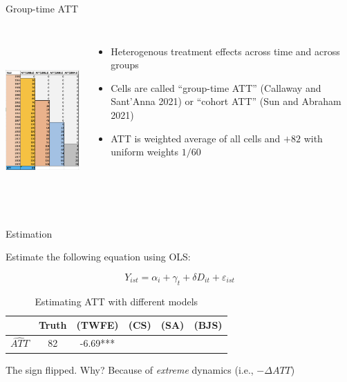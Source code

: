\documentclass{beamer}
\begin{document}
\begin{frame}{Group-time ATT}
       \begin{columns}
             \centering
             \includegraphics[height=6.5cm, width=5.5cm]{./lecture_includes/baker_attgt}
		\begin{itemize}
\item Heterogenous treatment effects across time and across groups
\item Cells are called ``group-time ATT'' (Callaway and Sant'Anna 2021) or ``cohort ATT'' (Sun and Abraham 2021)
\item ATT is weighted average of all cells and $+82$ with uniform weights $1/60$
		\end{itemize}
         \end{columns} 
    \end{frame}
    
    

\begin{frame}{Estimation}

\bigskip

Estimate the following equation using OLS:

$$Y_{ist} = \alpha_i + \gamma_t +\delta D_{it} + \varepsilon_{ist}$$


\begin{table}[htbp]\centering
\small
\caption{Estimating ATT with different models}
\begin{center}
\begin{tabular}{l*{5}{c}}
\hline
\multicolumn{1}{l}{\textbf{}}&
\multicolumn{1}{c}{\textbf{Truth}}&
\multicolumn{1}{c}{\textbf{(TWFE)}}&
\multicolumn{1}{c}{\textbf{(CS)}}&
\multicolumn{1}{c}{\textbf{(SA)}}&
\multicolumn{1}{c}{\textbf{(BJS)}}\\
\hline
$\widehat{ATT}$  & 82    & -6.69*** &&&\\
\hline
\end{tabular}
\end{center}
\end{table}

The sign flipped.  Why?  Because of \emph{extreme} dynamics (i.e., $- \Delta ATT$)

\end{frame}
\end{document}
